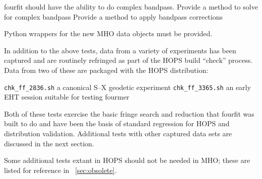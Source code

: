 \begin{description}
 \ac{fourfit} should have the ability to do complex bandpass.
 Provide a method to solve for complex bandpass
 Provide a method to apply bandpass corrections

 Python wrappers for the new \acs{MHO} data objects must be
    provided.
\end{description}


In addition to the above tests, data from a variety of experiments
has been captured and are routinely refringed as part of the
\ac{HOPS} build ``check'' process.  Data from two of
these are packaged with the \ac{HOPS} distribution:
\begin{description}
 \texttt{chk\_ff\_2836.sh} a canonical S--X geodetic experiment
 \texttt{chk\_ff\_3365.sh} an early \ac{EHT} session suitable for
    testing \ac{fourmer}
\end{description}
Both of these tests exercise the basic fringe search and reduction
that \ac{fourfit} was built to do and have been the basis of standard
regression for \ac{HOPS} and distribution validation.   Additional tests
with other captured data sets are discussed in the next section.

Some additional tests extant in \ac{HOPS} should not be needed in
\ac{MHO}; these are listed for reference in \App~\ref{sec:obsolete}.


